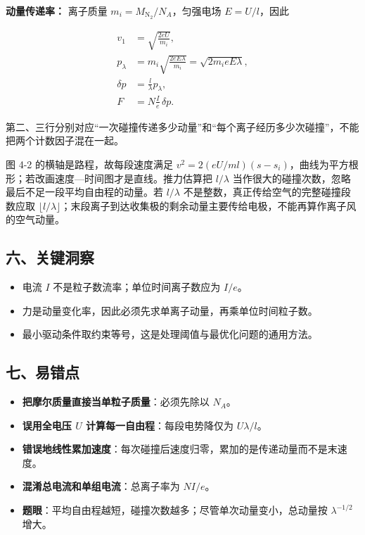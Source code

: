 \documentclass[12pt,a4paper,UTF8]{ctexart}
\newcommand{\tightlist}{\setlength{\itemsep}{0pt}\setlength{\parskip}{0pt}}
\begin{document}
\textbf{动量传递率：} 离子质量 \(m_i=M_{\mathrm{N_2}}/N_A\)，匀强电场
\(E=U/l\)，因此

\[\begin{aligned}
v_1&=\sqrt{\frac{2eU}{m_i}},\\
p_{\lambda}&=m_i\sqrt{\frac{2eE\lambda}{m_i}}
=\sqrt{2m_ieE\lambda},\\
\delta p&=\frac l\lambda p_{\lambda},\\
F&=N\frac Ie\,\delta p.
\end{aligned}\]

第二、三行分别对应``一次碰撞传递多少动量''和``每个离子经历多少次碰撞''，不能把两个计数因子混在一起。

图 4-2 的横轴是路程，故每段速度满足
\(v^2=2(eU/ml)(s-s_i)\)，曲线为平方根形；若改画速度---时间图才是直线。推力估算把
\(l/\lambda\) 当作很大的碰撞次数，忽略最后不足一段平均自由程的动量。若
\(l/\lambda\) 不是整数，真正传给空气的完整碰撞段数应取
\(\lfloor l/\lambda\rfloor\)；末段离子到达收集极的剩余动量主要传给电极，不能再算作离子风的空气动量。

\subsection{六、关键洞察}\label{ux516dux5173ux952eux6d1eux5bdf-3}

\begin{itemize}
\tightlist
\item
  电流 \(I\) 不是粒子数流率；单位时间离子数应为 \(I/e\)。
\item
  力是动量变化率，因此必须先求单离子动量，再乘单位时间粒子数。
\item
  最小驱动条件取约束等号，这是处理阈值与最优化问题的通用方法。
\end{itemize}

\subsection{七、易错点}\label{ux4e03ux6613ux9519ux70b9-3}

\begin{itemize}
\tightlist
\item
  \textbf{把摩尔质量直接当单粒子质量}：必须先除以 \(N_A\)。
\item
  \textbf{误用全电压 \(U\) 计算每一自由程}：每段电势降仅为
  \(U\lambda/l\)。
\item
  \textbf{错误地线性累加速度}：每次碰撞后速度归零，累加的是传递动量而不是末速度。
\item
  \textbf{混淆总电流和单组电流}：总离子率为 \(NI/e\)。
\item
  \textbf{题眼}：平均自由程越短，碰撞次数越多；尽管单次动量变小，总动量按
  \(\lambda^{-1/2}\) 增大。
\end{itemize}
\end{document}
